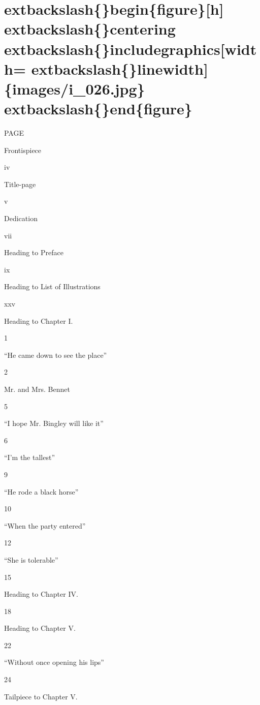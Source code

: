 \documentclass[10pt]{book}
\begin{document}
\section{	extbackslash\{\}begin\{figure\}[h]
	extbackslash\{\}centering
	extbackslash\{\}includegraphics[width=	extbackslash\{\}linewidth]\{images/i\_026.jpg\}
	extbackslash\{\}end\{figure\}}

       PAGE
      

      Frontispiece
     

       iv
      

      Title-page
     

       v
      

      Dedication
     

       vii
      

      Heading to Preface
     

       ix
      

      Heading to List of Illustrations
     

       xxv
      

      Heading to Chapter I.
     

       1
      

      “He came down to see the place”
     

       2
      

      Mr. and Mrs. Bennet
     

       5
      

      “I hope Mr. Bingley will like it”
     

       6
      

      “I’m the tallest”
     

       9
      

      “He rode a black horse”
     

       10
      

      “When the party entered”
     

       12
      

      “She is tolerable”
     

       15
      

      Heading to Chapter IV.
     

       18
      

      Heading to Chapter V.
     

       22
      

      “Without once opening his lips”
     

       24
      

      Tailpiece to Chapter V.
     
\end{document}
